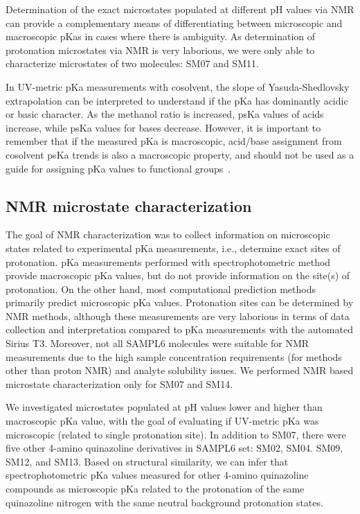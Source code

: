 \documentclass[9pt,lineno]{elife}
\begin{document}
Determination of the exact microstates populated at different pH values via NMR can provide a complementary means of differentiating between microscopic and macroscopic pKas in cases where there is ambiguity.
As determination of protonation microstates via NMR is very laborious, we were only able to characterize microstates of two molecules: SM07 and SM11. 

In UV-metric pKa measurements with cosolvent, the slope of Yasuda-Shedlovsky extrapolation can be interpreted to understand if the pKa has dominantly acidic or basic character. 
As the methanol ratio is increased, psKa values of acids increase, while psKa values for bases decrease. 
However, it is important to remember that if the measured pKa is macroscopic, acid/base assignment from cosolvent psKa trends is also a macroscopic property, and should not be used as a guide for assigning pKa values to functional groups~\citep{fraczkiewicz_silico_2013}.

\subsection{NMR microstate characterization}

The goal of NMR characterization was to collect information on microscopic states related to experimental pKa measurements, i.e., determine exact sites of protonation. 
pKa measurements performed with spectrophotometric method provide macroscopic pKa values, but do not provide information on the site(s) of protonation. 
On the other hand, most computational prediction methods primarily predict microscopic pKa values. 
Protonation sites can be determined by NMR methods, although these measurements are very laborious in terms of data collection and interpretation compared to pKa measurements with the automated Sirius T3. 
Moreover, not all SAMPL6 molecules were suitable for NMR measurements due to the high sample concentration requirements (for methods other than proton NMR) and analyte solubility issues. 
We performed NMR based microstate characterization only for SM07 and SM14. 

We investigated microstates populated at pH values lower and higher than macroscopic pKa value, with the goal of evaluating if UV-metric pKa was microscopic (related to single protonation site).
In addition to SM07, there were five other 4-amino quinazoline derivatives in SAMPL6 set: SM02, SM04. SM09, SM12, and SM13. 
Based on structural similarity, we can infer that spectrophotometric pKa values measured for other 4-amino quinazoline compounds as microscopic pKa related to the protonation of the same quinazoline nitrogen with the same neutral background protonation states.
\end{document}
